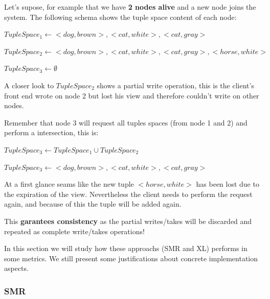 \documentclass[times, 10pt,twocolumn]{article}
\begin{document}
Let's supose, for example that we have \textbf{2 nodes alive} and a new node joins the system.
The following schema shows the tuple space content of each node:

$ TupleSpace_{1} \leftarrow <dog, brown>, <cat, white>, <cat, gray> $

$ TupleSpace_{2} \leftarrow <dog, brown>, <cat, white>, <cat, gray>, <horse, white> $

$ TupleSpace_{3} \leftarrow \emptyset $

A closer look to $TupleSpace_{2}$ shows a partial write operation, this is
the client's front end wrote on node 2 but lost his view and therefore couldn't write on other nodes.

Remember that node 3 will request all tuples spaces (from node 1 and 2) and perform a intersection, this is:

$ TupleSpace_{3} \leftarrow TupleSpace_{1} \cup TupleSpace_{2} $

$ TupleSpace_{3} \leftarrow <dog, brown>, <cat, white>, <cat, gray>$

At a first glance seams like the new tuple $<horse, white>$ has been lost due 
to the expiration of the view. Nevertheless the client needs to perform the 
request again, and because of this the tuple will be added again.

This \textbf{garantees consistency} as the partial writes/takes will be discarded
and repeated as complete write/takes operations!


In this section we will study how these approachs (SMR and XL) performs in some metrics.
We still present some justifications about concrete implementation aspects.

\subsubsection{SMR}

\end{document}
